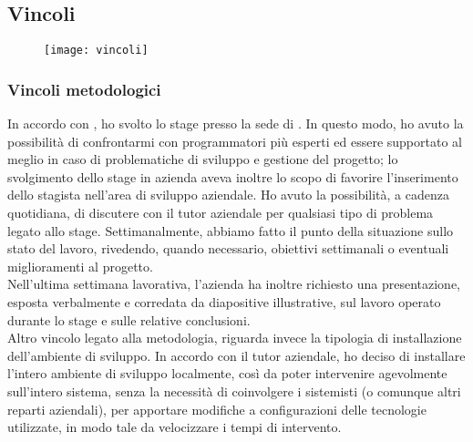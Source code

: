 	\subsection{Vincoli}
	
	\begin{figure}[htbp]
		\begin{center}
			\texttt{[image: vincoli]}
		\end{center}
	\end{figure}
	
		\subsubsection{Vincoli metodologici}
		In accordo con \nomeAzienda, ho svolto lo stage presso la sede di \locazioneAzienda. In questo modo, ho avuto la possibilità di confrontarmi con programmatori più esperti ed essere supportato al meglio in caso di problematiche di sviluppo e gestione del progetto; lo svolgimento dello stage in azienda aveva inoltre lo scopo di favorire l’inserimento dello stagista nell'area di sviluppo aziendale.
		Ho avuto la possibilità, a cadenza quotidiana, di discutere con il tutor aziendale per qualsiasi tipo di problema legato allo stage. Settimanalmente, abbiamo fatto il punto della situazione sullo stato del lavoro, rivedendo, quando necessario, obiettivi settimanali o eventuali miglioramenti al progetto. \\
		Nell'ultima settimana lavorativa, l'azienda ha inoltre richiesto una presentazione, esposta verbalmente e corredata da diapositive illustrative, sul lavoro operato durante lo stage e sulle relative conclusioni. \\
		Altro vincolo legato alla metodologia, riguarda invece la tipologia di installazione dell'ambiente di sviluppo. In accordo con il tutor aziendale, ho deciso di installare l'intero ambiente di sviluppo localmente, così da poter intervenire agevolmente sull'intero sistema, senza la necessità di coinvolgere i sistemisti (o comunque altri reparti aziendali), per apportare modifiche a configurazioni delle tecnologie utilizzate, in modo tale da velocizzare i tempi di intervento.
		
